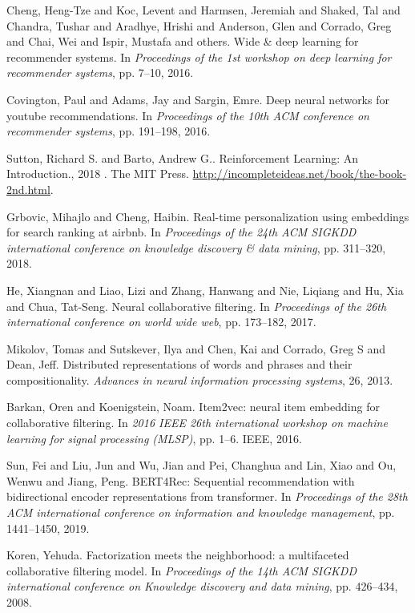 \begin{thebibliography}{99}
 Cheng, Heng-Tze and Koc, Levent and Harmsen, Jeremiah and Shaked, Tal and Chandra, Tushar and Aradhye, Hrishi and Anderson, Glen and Corrado, Greg and Chai, Wei and Ispir, Mustafa and others. {W}ide \& deep learning for recommender systems. In \textit{Proceedings of the 1st workshop on deep learning for recommender systems}, pp. 7--10, 2016.

 Covington, Paul and Adams, Jay and Sargin, Emre. {D}eep neural networks for youtube recommendations. In \textit{Proceedings of the 10th ACM conference on recommender systems}, pp. 191--198, 2016.

 Sutton, Richard S. and Barto, Andrew G.. {R}einforcement {L}earning: {A}n {I}ntroduction., 2018 . The MIT Press. \url{http://incompleteideas.net/book/the-book-2nd.html}.

 Grbovic, Mihajlo and Cheng, Haibin. {R}eal-time personalization using embeddings for search ranking at airbnb. In \textit{Proceedings of the 24th ACM SIGKDD international conference on knowledge discovery \& data mining}, pp. 311--320, 2018.

 He, Xiangnan and Liao, Lizi and Zhang, Hanwang and Nie, Liqiang and Hu, Xia and Chua, Tat-Seng. {N}eural collaborative filtering. In \textit{Proceedings of the 26th international conference on world wide web}, pp. 173--182, 2017.

 Mikolov, Tomas and Sutskever, Ilya and Chen, Kai and Corrado, Greg S and Dean, Jeff. {D}istributed representations of words and phrases and their compositionality. \textit{Advances in neural information processing systems}, 26, 2013.

 Barkan, Oren and Koenigstein, Noam. {I}tem2vec: neural item embedding for collaborative filtering. In \textit{2016 IEEE 26th international workshop on machine learning for signal processing (MLSP)}, pp. 1--6. IEEE, 2016.

 Sun, Fei and Liu, Jun and Wu, Jian and Pei, Changhua and Lin, Xiao and Ou, Wenwu and Jiang, Peng. B{E}RT4{R}ec: {S}equential recommendation with bidirectional encoder representations from transformer. In \textit{Proceedings of the 28th ACM international conference on information and knowledge management}, pp. 1441--1450, 2019.

 Koren, Yehuda. {F}actorization meets the neighborhood: a multifaceted collaborative filtering model. In \textit{Proceedings of the 14th ACM SIGKDD international conference on Knowledge discovery and data mining}, pp. 426--434, 2008.


\end{thebibliography}
